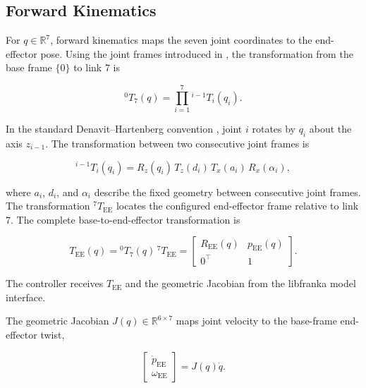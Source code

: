 \subsection{Forward Kinematics}
\label{subsec:forward_kinematics}

For \mbox{\(q\in\mathbb{R}^7\)}, forward kinematics maps the seven joint
coordinates to the end-effector pose. Using the joint frames introduced in
\mbox{}, the transformation from the base frame
\mbox{\(\{0\}\)} to link 7 is

\begin{equation}
{}^0T_7(q)
=
\prod_{i=1}^{7}{}^{i-1}T_i(q_i).
\label{eq:forward_kinematics_chain}
\end{equation}

In the standard Denavit--Hartenberg convention
\mbox{\cite{Denavit1955,Craig2005,Siciliano2009}}, joint \mbox{\(i\)} rotates by \mbox{\(q_i\)}
about the axis \mbox{\(z_{i-1}\)}. The transformation between two consecutive joint
frames is

\begin{equation}
{}^{i-1}T_i(q_i)
=
R_z(q_i)\,T_z(d_i)\,T_x(a_i)\,R_x(\alpha_i),
\label{eq:dh_elementary_transformations}
\end{equation}

where \mbox{\(a_i\)}, \mbox{\(d_i\)}, and \mbox{\(\alpha_i\)} describe the
fixed geometry between consecutive joint frames. The transformation
\mbox{\({}^{7}T_{\mathrm{EE}}\)} locates the configured end-effector frame
relative to link 7. The complete base-to-end-effector transformation is

\begin{equation}
T_{\mathrm{EE}}(q)
=
{}^0T_7(q)\,{}^{7}T_{\mathrm{EE}}
=
\begin{bmatrix}
R_{\mathrm{EE}}(q) & p_{\mathrm{EE}}(q)\\
0^\top & 1
\end{bmatrix}.
\label{eq:forward_kinematics_result}
\end{equation}

The controller receives \mbox{\(T_{\mathrm{EE}}\)} and the geometric Jacobian
from the libfranka model interface.

The geometric Jacobian \mbox{\(J(q)\in\mathbb{R}^{6\times7}\)} maps joint
velocity to the base-frame end-effector twist,

\begin{equation}
\begin{bmatrix}
\dot p_{\mathrm{EE}}\\
\omega_{\mathrm{EE}}
\end{bmatrix}
=J(q)\dot q.
\label{eq:differential_kinematics}
\end{equation}

